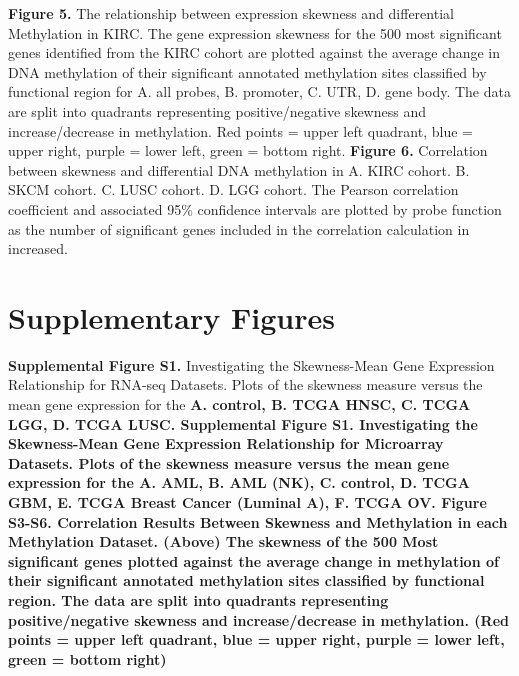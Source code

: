 \documentclass[11pt]{article}
\begin{document}
\newline
\newline
\textbf{Figure 5.} The relationship between expression skewness and differential Methylation in KIRC. The gene expression skewness for the 500 most significant genes identified from the KIRC cohort are plotted against the average change in DNA methylation of their significant annotated methylation sites classified by functional region for A. all probes, B. promoter, C. UTR, D. gene body. The data are split into quadrants representing positive/negative skewness and increase/decrease in methylation. Red points = upper left quadrant, blue = upper right, purple = lower left, green = bottom right.
\newline
\newline
\textbf{Figure 6.} Correlation between skewness and differential DNA methylation in A. KIRC cohort. B. SKCM cohort. C. LUSC cohort. D. LGG cohort. The Pearson correlation coefficient and associated 95\% confidence intervals are plotted by probe function as the number of significant genes included in the correlation calculation in increased.

\section*{Supplementary Figures}

\textbf{Supplemental Figure S1.} Investigating the Skewness-Mean Gene Expression Relationship for RNA-seq Datasets. Plots of the skewness measure versus the mean gene expression for the \bf{A.} control, \bf{B.} TCGA HNSC, \bf{C}. TCGA LGG, \bf{D.} TCGA LUSC.
\newline
\newline
\textbf{Supplemental Figure S1.} Investigating the Skewness-Mean Gene Expression Relationship for Microarray Datasets. Plots of the skewness measure versus the mean gene expression for the \bf{A.} AML, \bf{B.} AML (NK), \bf{C.} control, \bf{D.} TCGA GBM, \bf{E.} TCGA Breast Cancer (Luminal A), \bf{F.} TCGA OV. 
\newline
\newline
\textbf{Figure S3-S6.} Correlation Results Between Skewness and Methylation in each Methylation Dataset. (Above) The skewness of the 500 Most significant genes plotted against the average change in methylation of their significant annotated methylation sites classified by functional region. The data are split into quadrants representing positive/negative skewness and increase/decrease in methylation. (Red points = upper left quadrant, blue = upper right, purple = lower left, green = bottom right)
\end{document}
